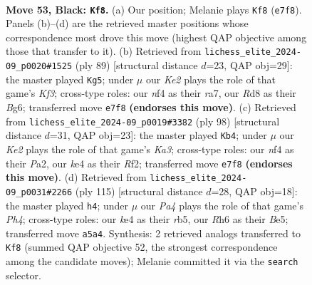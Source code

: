 \documentclass[11pt]{article}
\begin{document}
\clearpage

\begin{figure}[p]\centering
\begin{subfigure}{0.46\textwidth}\centering
\resizebox{\linewidth}{!}{%
\newchessgame
\chessboard[
  setfen={3r4/4kp2/7r/p7/3pKN2/1P6/1R5P/2R5 b - - 1 53},
  showmover=false,
  pgfstyle=straightmove, color=movearrow, markmove={e7-f8}
]}
\caption{}
\end{subfigure}\hfill
\begin{subfigure}{0.46\textwidth}\centering
\resizebox{\linewidth}{!}{%
\newchessgame
\chessboard[
  setfen={8/R7/1p3kb1/8/3Np1p1/4P1K1/Pr6/8 b - - 1 45},
  showmover=false,
  pgfstyle=straightmove, color=movearrow, markmove={f6-g5}
]}
\caption{}
\end{subfigure}
\\[4pt]
\begin{subfigure}{0.46\textwidth}\centering
\resizebox{\linewidth}{!}{%
\newchessgame
\chessboard[
  setfen={8/8/1p2k3/3p4/3P3P/KP3p1r/P4R2/8 w - - 1 50},
  showmover=false,
  pgfstyle=straightmove, color=movearrow, markmove={a3-b4}
]}
\caption{}
\end{subfigure}\hfill
\begin{subfigure}{0.46\textwidth}\centering
\resizebox{\linewidth}{!}{%
\newchessgame
\chessboard[
  setfen={8/6k1/7p/pR1Nb2p/8/1P3P2/r7/7K b - - 3 58},
  showmover=false,
  pgfstyle=straightmove, color=movearrow, markmove={h5-h4}
]}
\caption{}
\end{subfigure}
\caption{\textbf{Move 53, Black: \texttt{Kf8}.} (a) Our position; Melanie plays \texttt{Kf8} (\texttt{e7f8}). Panels (b)--(d) are the retrieved master positions whose correspondence most drove this move (highest QAP objective among those that transfer to it). (b) Retrieved from \texttt{lichess\_elite\_2024-09\_p0020\#1525} (ply 89) [structural distance $d$=23, QAP obj=29]: the master played \texttt{Kg5}; under $\mu$ our \emph{Ke2} plays the role of that game's \emph{Kf3}; cross-type roles: our \emph{n}f4 as their \emph{r}a7, our \emph{R}d8 as their \emph{B}g6; transferred move \texttt{e7f8} \textbf{(endorses this move)}. (c) Retrieved from \texttt{lichess\_elite\_2024-09\_p0019\#3382} (ply 98) [structural distance $d$=31, QAP obj=23]: the master played \texttt{Kb4}; under $\mu$ our \emph{Ke2} plays the role of that game's \emph{Ka3}; cross-type roles: our \emph{n}f4 as their \emph{P}a2, our \emph{k}e4 as their \emph{R}f2; transferred move \texttt{e7f8} \textbf{(endorses this move)}. (d) Retrieved from \texttt{lichess\_elite\_2024-09\_p0031\#2266} (ply 115) [structural distance $d$=28, QAP obj=18]: the master played \texttt{h4}; under $\mu$ our \emph{Pa4} plays the role of that game's \emph{Ph4}; cross-type roles: our \emph{k}e4 as their \emph{r}b5, our \emph{R}h6 as their \emph{B}e5; transferred move \texttt{a5a4}. Synthesis: 2 retrieved analogs transferred to \texttt{Kf8} (summed QAP objective 52, the strongest correspondence among the candidate moves); Melanie committed it via the \texttt{search} selector.}
\label{fig:thought-m105}
\end{figure}
\end{document}
